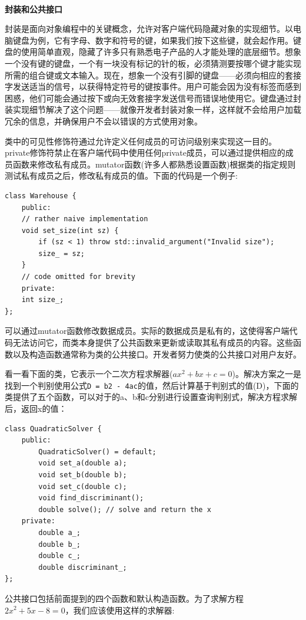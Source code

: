 \noindent\textbf{}\ \par
\textbf{封装和公共接口} \ \par
封装是面向对象编程中的关键概念，允许对客户端代码隐藏对象的实现细节。以电脑键盘为例，它有字母、数字和符号的键，如果我们按下这些键，就会起作用。键盘的使用简单直观，隐藏了许多只有熟悉电子产品的人才能处理的底层细节。想象一个没有键的键盘，一个有一块没有标记的针的板，必须猜测要按哪个键才能实现所需的组合键或文本输入。现在，想象一个没有引脚的键盘——必须向相应的套接字发送适当的信号，以获得特定符号的键按事件。用户可能会因为没有标签而感到困惑，他们可能会通过按下或向无效套接字发送信号而错误地使用它。键盘通过封装实现细节解决了这个问题——就像开发者封装对象一样，这样就不会给用户加载冗余的信息，并确保用户不会以错误的方式使用对象。 \par
类中的可见性修饰符通过允许定义任何成员的可访问级别来实现这一目的。private修饰符禁止在客户端代码中使用任何private成员，可以通过提供相应的成员函数来修改私有成员。mutator函数(许多人都熟悉设置函数)根据类的指定规则测试私有成员之后，修改私有成员的值。下面的代码是一个例子: \par

\begin{lstlisting}[caption={}]
class Warehouse {
	public:
	// rather naive implementation
	void set_size(int sz) {
		if (sz < 1) throw std::invalid_argument("Invalid size");
		size_ = sz;
	}
	// code omitted for brevity
	private:
	int size_;
};
\end{lstlisting}

可以通过mutator函数修改数据成员。实际的数据成员是私有的，这使得客户端代码无法访问它，而类本身提供了公共函数来更新或读取其私有成员的内容。这些函数以及构造函数通常称为类的公共接口。开发者努力使类的公共接口对用户友好。 \par
看一看下面的类，它表示一个二次方程求解器($ax^2 + bx + c = 0$)。解决方案之一是找到一个判别使用公式\texttt{D = b2 - 4ac}的值，然后计算基于判别式的值(D)，下面的类提供了五个函数，可以对于的a、b和c分别进行设置查询判别式，解决方程求解后，返回x的值： \par

\begin{lstlisting}[caption={}]
class QuadraticSolver {
	public:
		QuadraticSolver() = default;
		void set_a(double a);
		void set_b(double b);
		void set_c(double c);
		void find_discriminant();
		double solve(); // solve and return the x
	private:
		double a_;
		double b_;
		double c_;
		double discriminant_;
};
\end{lstlisting}

公共接口包括前面提到的四个函数和默认构造函数。为了求解方程$2x^2 + 5x - 8 = 0$，我们应该使用这样的求解器: \par

